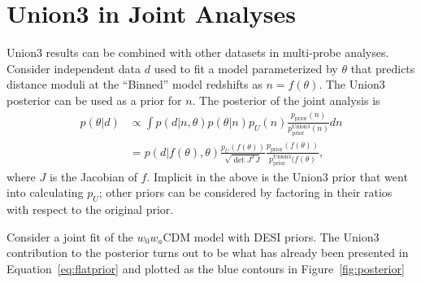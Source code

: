 \documentclass[11pt,a4paper]{article}
\begin{document}
\section{Union3 in Joint Analyses}
\label{sec:joint}
Union3 results can be combined with other datasets in multi-probe analyses.
Consider independent data $d$ used to fit a model parameterized by $\theta$
that predicts distance moduli at the ``Binned'' model redshifts as $n=f(\theta)$.
The Union3 posterior can be used as a prior for $n$.  The posterior of the joint analysis is
\begin{align}
p(\theta|d) &\propto \int  p(d|n,\theta)p(\theta|n)p_U(n) \frac{p_\text{prior}(n)}{p^\text{Union3}_\text{prior}(n)}dn\\
&=  p(d|f(\theta),\theta) \frac{p_U(f(\theta))} {\sqrt{\det{J^TJ}}} \frac{p_\text{prior}(f(\theta))}{p^\text{Union3}_\text{prior}(f(\theta)}, 
\label{eq:correct}
\end{align}
where $J$ is the Jacobian of $f$.
Implicit in the above is the Union3 prior
that went into calculating $p_U$; other priors can be considered by factoring in their ratios with respect to the 
original prior.

Consider a joint fit of the  $w_0w_a$CDM model with DESI priors.  The Union3 contribution to the posterior turns out to be
what has already been presented in 
Equation~\ref{eq:flatprior} and plotted as the blue contours in
Figure~\ref{fig:posterior} 
\end{document}
